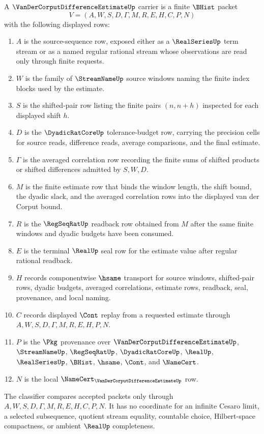 \begin{definition}
\label{def:van-der-corput-difference-estimate-carrier}
A $\VanDerCorputDifferenceEstimateUp$ carrier is a finite $\BHist$ packet
$$
V=(A,W,S,D,\Gamma,M,R,E,H,C,P,N)
$$
with the following displayed rows:
\begin{enumerate}
\item $A$ is the source-sequence row, exposed either as a $\RealSeriesUp$ term stream or as a named regular rational stream whose observations are read only through finite requests.
\item $W$ is the family of $\StreamNameUp$ source windows naming the finite index blocks used by the estimate.
\item $S$ is the shifted-pair row listing the finite pairs $(n,n+h)$ inspected for each displayed shift $h$.
\item $D$ is the $\DyadicRatCoreUp$ tolerance-budget row, carrying the precision cells for source reads, difference reads, average comparisons, and the final estimate.
\item $\Gamma$ is the averaged correlation row recording the finite sums of shifted products or shifted differences admitted by $S,W,D$.
\item $M$ is the finite estimate row that binds the window length, the shift bound, the dyadic slack, and the averaged correlation rows into the displayed van der Corput bound.
\item $R$ is the $\RegSeqRatUp$ readback row obtained from $M$ after the same finite windows and dyadic budgets have been consumed.
\item $E$ is the terminal $\RealUp$ seal row for the estimate value after regular rational readback.
\item $H$ records componentwise $\hsame$ transport for source windows, shifted-pair rows, dyadic budgets, averaged correlations, estimate rows, readback, seal, provenance, and local naming.
\item $C$ records displayed $\Cont$ replay from a requested estimate through $A,W,S,D,\Gamma,M,R,E,H,P,N$.
\item $P$ is the $\Pkg$ provenance over $\VanDerCorputDifferenceEstimateUp$, $\StreamNameUp$, $\RegSeqRatUp$, $\DyadicRatCoreUp$, $\RealUp$, $\RealSeriesUp$, $\BHist$, $\hsame$, $\Cont$, and $\NameCert$.
\item $N$ is the local $\NameCert_{\VanDerCorputDifferenceEstimateUp}$ row.
\end{enumerate}
The classifier compares accepted packets only through $A,W,S,D,\Gamma,M,R,E,H,C,P,N$. It has no coordinate for an infinite Cesaro limit, a selected subsequence, quotient stream equality, countable choice, Hilbert-space compactness, or ambient $\RealUp$ completeness.
\end{definition}

